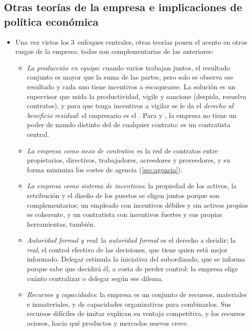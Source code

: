 \documentclass[11pt]{article}
\begin{document}
\subsection{Otras teorías de la empresa e implicaciones de política económica}\label{sec:otros-enfoques}

\begin{itemize}
\item Una vez vistos los 3~enfoques centrales, otras teorías ponen el acento en otros rasgos de la empresa; todas son complementarias de las anteriores:
  \begin{itemize}
  \item \emph{La producción en equipo}\nocite{AlchianDemsetz1972Production}: cuando varios trabajan juntos, el resultado conjunto es mayor que la suma de las partes, pero solo se observa ese resultado y cada uno tiene incentivos a escaquearse. La solución es un supervisor que mida la productividad, vigile y sancione (despida, resuelva contratos), y para que tenga incentivos a vigilar se le da el \emph{derecho al beneficio residual}: el empresario es el . Para  y , la empresa no tiene un poder de mando distinto del de cualquier contrato: es un contratista central.
  \item \emph{La empresa como nexo de contratos}\nocite{JensenMeckling1976Theory}: es la red de contratos entre propietarios, directivos, trabajadores, acreedores y proveedores, y su forma minimiza los costes de agencia (\ref{sec:agencia}).
  \item \emph{La empresa como sistema de incentivos}\nocite{HolmstromMilgrom1994Firm}: la propiedad de los activos, la retribución y el diseño de los puestos se eligen juntos porque son complementarios; un empleado con incentivos débiles y sin activos propios es coherente, y un contratista con incentivos fuertes y sus propias herramientas, también.
  \item \emph{Autoridad formal y real}\nocite{AghionTirole1997Formal}: la \emph{autoridad formal} es el derecho a decidir; la \emph{real}, el control efectivo de las decisiones, que tiene quien está mejor informado. Delegar estimula la iniciativa del subordinado, que se informa porque sabe que decidirá él, a costa de perder control: la empresa elige cuánto centralizar o delegar según ese dilema.
  \item \emph{Recursos y capacidades}\nocite{Penrose1959Theory,Wernerfelt1984Resource}: la empresa es un conjunto de recursos, materiales e inmateriales, y de capacidades organizativas para combinarlos. Sus recursos difíciles de imitar explican su ventaja competitiva, y los recursos ociosos, hacia qué productos y mercados nuevos crece.

\end{itemize}
\end{itemize}
\end{document}
